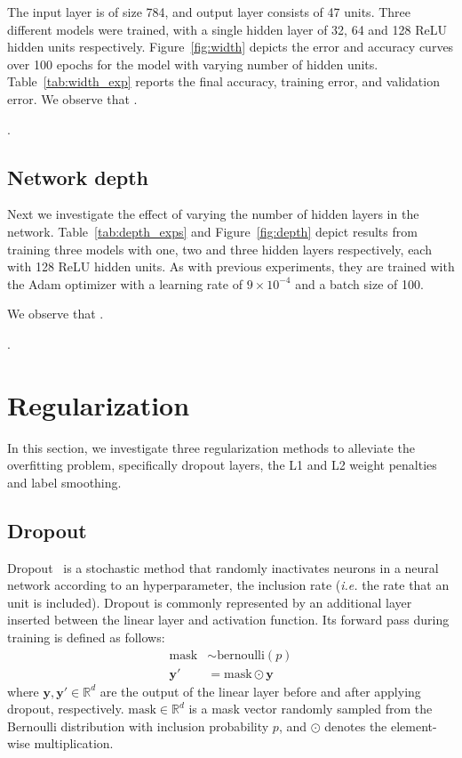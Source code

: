 \documentclass{article}
\begin{document}
The input layer is of size 784, and output layer consists of 47 units. 
Three different models were trained, with a single hidden layer of 32, 64 and 128 ReLU hidden units respectively.
Figure~\ref{fig:width} depicts the error and accuracy curves over 100 epochs for the model with varying number of hidden units.
Table~\ref{tab:width_exp} reports the final accuracy, training error, and validation error.
We observe that \questionTwo.

\questionThree.


\subsection{Network depth}

\questionTableTwo
\questionFigureThree

Next we investigate the effect of varying the number of hidden layers in the network. 
Table~\ref{tab:depth_exps} and Figure~\ref{fig:depth} depict results from training three models with one, two and three hidden layers respectively, each with 128 ReLU hidden units. 
As with previous experiments, they are trained with the Adam optimizer with a learning rate of $9 \times 10^{-4}$ and a batch size of 100. 

We observe that \questionFour.

\questionFive.




\section{Regularization}
\label{sec:task2.1} 

In this section, we investigate three regularization methods to alleviate the overfitting problem, specifically dropout layers, the L1 and L2 weight penalties and label smoothing.


\subsection{Dropout}

Dropout~\cite{srivastava2014dropout} is a stochastic method that randomly inactivates neurons in a neural network according to an hyperparameter, the inclusion rate  (\textit{i.e.} the rate that an unit is included).
Dropout is commonly represented by an additional layer inserted between the linear layer and activation function.
Its forward pass during training is defined as follows:
\begin{align}
    \text{mask} &\sim \text{bernoulli}(p)\\
    \bm{y}' &= \text{mask} \odot \bm{y}\
\end{align}
where $\bm{y}, \bm{y}' \in \mathbb{R}^d$ are the output of the linear layer before and after applying dropout, respectively. 
$\text{mask} \in \mathbb{R}^d$ is a mask vector randomly sampled from the Bernoulli distribution with inclusion probability $p$, and $\odot$ denotes the element-wise multiplication.
\end{document}

